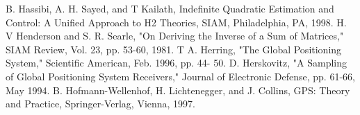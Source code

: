 \begin{thebibliography}{99}
 B. Hassibi, A. H. Sayed, and T Kailath, Indefinite Quadratic Estimation and Control: A
Unified Approach to H2 Theories, SIAM, Philadelphia, PA, 1998.
 H. V Henderson and S. R. Searle, "On Deriving the Inverse of a Sum of Matrices," SIAM
Review, Vol. 23, pp. 53-60, 1981.
 T A. Herring, "The Global Positioning System," Scientific American, Feb. 1996, pp. 44-
50.
 D. Herskovitz,  "A Sampling of Global Positioning System Receivers," Journal of
Electronic Defense, pp. 61-66, May 1994.
 B. Hofmann-Wellenhof, H. Lichtenegger, and J. Collins, GPS: Theory and Practice,
Springer-Verlag, Vienna, 1997.

\end{thebibliography}

